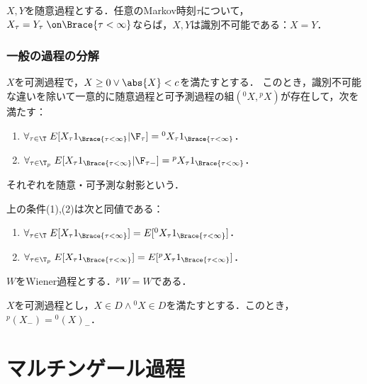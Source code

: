 \documentclass[uplatex,dvipdfmx]{jsreport}
\begin{document}
\begin{corollary}[2つの随意過程が識別不可能であるための条件]
    $X,Y$を随意過程とする．任意のMarkov時刻$\tau$について，$X_\tau=Y_\tau\;\on\Brace{\tau<\infty}$ならば，$X,Y$は識別不可能である：$X=Y$．
\end{corollary}

\subsection{一般の過程の分解}

\begin{theorem}
    $X$を可測過程で，$X\ge0\lor\abs{X}<c$を満たすとする．
    このとき，識別不可能な違いを除いて一意的に随意過程と可予測過程の組$({}^0X,{}^pX)$が存在して，次を満たす：
    \begin{enumerate}
        \item $\forall_{\tau\in\T}\;E[X_\tau1_{\Brace{\tau<\infty}}|\F_\tau]={}^0X_\tau1_{\Brace{\tau<\infty}}$．
        \item $\forall_{\tau\in\T_p}\;E[X_\tau1_{\Brace{\tau<\infty}}|\F_{\tau-}]={}^pX_\tau1_{\Brace{\tau<\infty}}$．
    \end{enumerate}
    それぞれを随意・可予測な射影という．
\end{theorem}
\begin{remarks}
    上の条件(1),(2)は次と同値である：
    \begin{enumerate}
        \item $\forall_{\tau\in\T}\;E[X_\tau1_{\Brace{\tau<\infty}}]=E[{}^0X_\tau1_{\Brace{\tau<\infty}}]$．
        \item $\forall_{\tau\in\T_p}\;E[X_\tau1_{\Brace{\tau<\infty}}]=E[{}^pX_\tau1_{\Brace{\tau<\infty}}]$．
    \end{enumerate}
\end{remarks}

\begin{example}
    $W$をWiener過程とする．${}^pW=W$である．
\end{example}

\begin{theorem}
    $X$を可測過程とし，$X\in D\land {}^0X\in D$を満たすとする．このとき，${}^p(X_-)={}^0(X)_-$．
\end{theorem}

\chapter{マルチンゲール過程}
\end{document}

